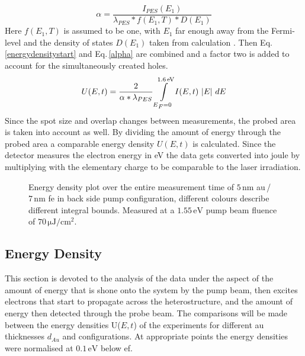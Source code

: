 \documentclass[a4paper,12pt,twoside]{article}
\begin{document}
\begin{equation}
\alpha = \frac{I_{PES}(E_{1})}{\lambda_{PES}*f(E_{1},T)*D(E_{1})}
\end{equation}
Here $f(E_1,T)$ is assumed to be one, with $E_1$ far enough away from the Fermi-level and the density of states $D(E_1)$ taken from calculation \cite{Papaconstantopoulos2015}. Then Eq.\,\ref{energydensitystart} and Eq.\,\ref{alpha} are combined and a factor two is added to account for the simultaneously created holes.
    \begin{equation}
        \label{energydensity}
        U(E,t) = \frac{ 2 }{ \alpha * \lambda_{PES} }\int\limits_{E\textsubscript{\textit F} = 0}^{ 1.6\,\mathrm{eV} }{ I(E,t)\, \left\lvert E \right\rvert \,dE}
    \end{equation}
Since the spot size and overlap changes between measurements, the probed area is taken into account as well. By dividing the amount of energy through the probed area a comparable energy density $U(E,t)$ is calculated. Since the detector measures the electron energy in eV the data gets converted into joule by multiplying with the elementary charge to be comparable to the laser irradiation.
	\begin{figure}[H]
		\caption{Energy density plot over the entire measurement time of $5\,\mathrm{nm}$ \gls{au}\,/\,$7\,\mathrm{nm}$ \gls{fe} in back side pump configuration, different colours describe different integral bounds. Measured at a $1.55\,\mathrm{eV}$ pump beam fluence of $70\,\mathrm{\mu J/cm^2}$.}
	    	\label{5BP}
	\end{figure}
	
	        \subsection{Energy Density}
            \label{energydensitychap}
This section is devoted to the analysis of the data under the aspect of the amount of energy that is shone onto the system by the pump beam, then excites electrons that start to propagate across the heterostructure, and the amount of energy then detected through the probe beam. The comparisons will be made between the energy densities U($E,t$) of the experiments for different \gls{au} thicknesses $d_{Au}$ and configurations. At appropriate points the energy densities were normalised at $0.1\,\mathrm{\mbox{eV}}$ below \gls{ef}.
\end{document}
